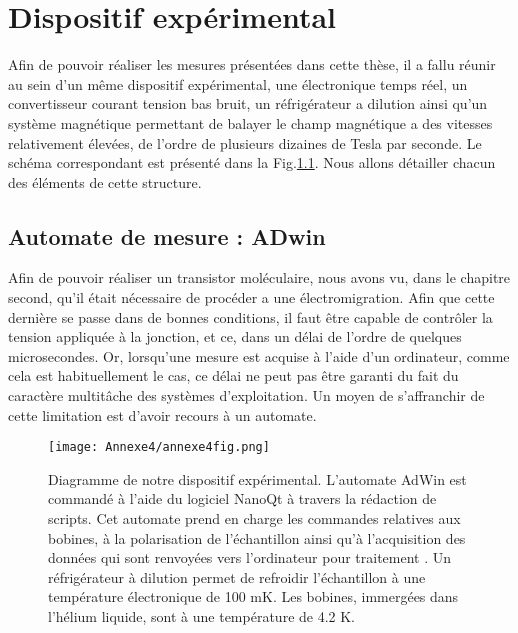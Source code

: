 \chapter{Dispositif expérimental}


Afin de pouvoir réaliser les mesures présentées dans cette thèse, il a fallu réunir au sein d’un même dispositif expérimental, une électronique temps réel, un convertisseur courant tension bas bruit, un réfrigérateur a dilution ainsi qu’un système magnétique permettant de balayer le champ magnétique a des vitesses relativement élevées, de l’ordre de plusieurs dizaines de Tesla par seconde. Le schéma correspondant est présenté dans la Fig.\ref{ann3fig}. Nous allons détailler chacun des éléments de cette structure.

\section{Automate de mesure : ADwin}
Afin de pouvoir réaliser un transistor moléculaire, nous avons vu, dans le chapitre second, qu’il était nécessaire de procéder a une électromigration. Afin que cette dernière se passe dans de bonnes conditions, il faut être capable de contrôler la tension appliquée à la jonction, et ce, dans un délai de l’ordre
de quelques microsecondes. Or, lorsqu’une mesure est acquise à l’aide d’un ordinateur, comme cela est habituellement le cas, ce délai ne peut pas être garanti du fait du caractère multitâche des systèmes d’exploitation. Un moyen de s’affranchir de cette limitation est d’avoir recours à un automate.

\begin{figure}
\centering \texttt{[image: Annexe4/annexe4fig.png]}
\caption{Diagramme de notre dispositif expérimental. L’automate AdWin est commandé à l’aide du logiciel NanoQt à travers la rédaction de scripts. Cet automate prend en charge les commandes relatives aux bobines, à la polarisation de l’échantillon ainsi qu’à l’acquisition des données qui sont renvoyées vers l’ordinateur pour traitement . Un réfrigérateur à dilution permet de refroidir l’échantillon à une température électronique de 100 mK. Les bobines, immergées dans l’hélium liquide, sont à une température de 4.2 K.}
\label{ann3fig}
\end{figure}

